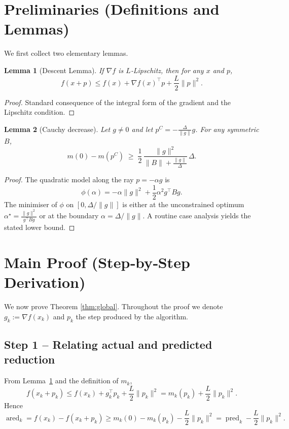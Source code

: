 \documentclass[11pt]{article}
\newtheorem{lemma}{Lemma}[section]
\begin{document}
\section*{Preliminaries (Definitions and Lemmas)}
We first collect two elementary lemmas.

\begin{lemma}[Descent Lemma]\label{lem:descent}
If $\nabla f$ is $L$‑Lipschitz, then for any $x$ and $p$,
\[
f(x+p)\le f(x)+\nabla f(x)^{\top}p+\frac{L}{2}\|p\|^{2}.
\]
\end{lemma}
\begin{proof}
Standard consequence of the integral form of the gradient and the Lipschitz condition.
\end{proof}

\begin{lemma}[Cauchy decrease]\label{lem:cauchy}
Let $g\neq0$ and let $p^{C}= -\frac{\Delta}{\|g\|}g$.
For any symmetric $B$,
\[
m(0)-m(p^{C})\;\ge\;\frac{1}{2}\,\frac{\|g\|^{2}}{\|B\|+\frac{\|g\|}{\Delta}}\,\Delta .
\]
\end{lemma}
\begin{proof}
The quadratic model along the ray $p=-\alpha g$ is
\[
\phi(\alpha)= -\alpha\|g\|^{2}+\frac12\alpha^{2}g^{\top}Bg.
\]
The minimiser of $\phi$ on $[0,\Delta/\|g\|]$ is either at the unconstrained optimum
$\alpha^{\star}= \frac{\|g\|^{2}}{g^{\top}Bg}$ or at the boundary $\alpha=\Delta/\|g\|$.
A routine case analysis yields the stated lower bound.
\end{proof}

\section*{Main Proof (Step‑by‑Step Derivation)}
We now prove Theorem \ref{thm:global}.  Throughout the proof we denote 
$g_{k}:=\nabla f(x_{k})$ and $p_{k}$ the step produced by the algorithm.

\subsection*{Step 1 – Relating actual and predicted reduction}
From Lemma~\ref{lem:descent} and the definition of $m_{k}$,
\[
f(x_{k}+p_{k})\le f(x_{k})+g_{k}^{\top}p_{k}+\frac{L}{2}\|p_{k}\|^{2}
= m_{k}(p_{k})+\frac{L}{2}\|p_{k}\|^{2}.
\]
Hence
\[
\operatorname{ared}_{k}=f(x_{k})-f(x_{k}+p_{k})\ge
m_{k}(0)-m_{k}(p_{k})-\frac{L}{2}\|p_{k}\|^{2}
= \operatorname{pred}_{k}-\frac{L}{2}\|p_{k}\|^{2}.
\tag{1}
\label{eq:ared}
\]
\end{document}
